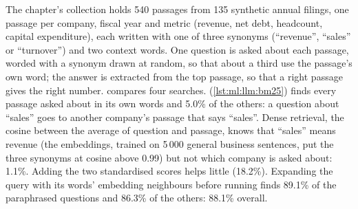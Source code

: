The chapter's collection holds 540 passages from 135 synthetic annual filings, one passage per company, fiscal year and
metric (revenue, net debt, headcount, capital expenditure), each written with one of three synonyms (``revenue'', ``sales''
or ``turnover'') and two context words. One question is asked about each passage, worded with a synonym drawn at random, so
that about a third use the passage's own word; the answer is extracted from the top passage, so that a right passage
gives the right number.  compares four searches.  (\cref{lst:ml:llm:bm25}) finds every
passage asked about in its own words and 5.0\% of the others: a question about ``sales'' goes to another company's passage
that says ``sales''. Dense retrieval, the cosine between the average  of question and passage, knows that
``sales'' means revenue (the embeddings, trained on 5\,000 general business sentences, put the three synonyms at cosine
above 0.99) but not which company is asked about: 1.1\%. Adding the two standardised scores helps little (18.2\%). Expanding
the query with its words' embedding neighbours before running  finds 89.1\% of the paraphrased questions and 86.3\% of
the others: 88.1\% overall.

\begin{omfigure}

\label{fig:ml:llm:retrieval}
\end{omfigure}

